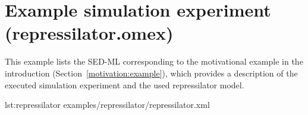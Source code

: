 \section{Example simulation experiment (repressilator.omex)}
\label{example:repressilator}
This example lists the SED-ML corresponding to the motivational example in the introduction (Section~\ref{motivation:example}), which provides a description of the executed simulation experiment and the used repressilator model. 

{lst:repressilator}
{examples/repressilator/repressilator.xml}

%
%
%
%
%
%

